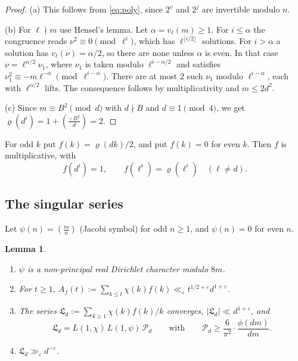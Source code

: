 \documentclass[11pt]{amsart}
\newtheorem{lemma}[theorem]{Lemma}
\theoremstyle{remark}
\theoremstyle{definition}
\numberwithin{equation}{section}
\newcommand{\eps}{\varepsilon}
\newcommand{\Lf}{\mathfrak{L}}
\newcommand{\leg}[2]{\left(\frac{#1}{#2}\right)}
\begin{document}
\begin{proof}
(a) This follows from \eqref{eq:poly}, since $2^v$ and $2^j$ are invertible modulo $n$.

(b) For $\ell\nmid m$ use Hensel's lemma. Let $\alpha=v_\ell(m)\ge1$. For $i\le\alpha$ the congruence reads $\nu^2\equiv0\pmod{\ell^i}$, which has $\ell^{\lfloor i/2\rfloor}$ solutions. For $i>\alpha$ a solution has $v_\ell(\nu)=\alpha/2$, so there are none unless $\alpha$ is even. In that case $\nu=\ell^{\alpha/2}\nu_1$, where $\nu_1$ is taken modulo $\ell^{i-\alpha/2}$ and satisfies $\nu_1^2\equiv-m\ell^{-\alpha}\pmod{\ell^{i-\alpha}}$. There are at most $2$ such $\nu_1$ modulo $\ell^{i-\alpha}$, each with $\ell^{\alpha/2}$ lifts. The consequence follows by multiplicativity and $m\le2d^2$.

(c) Since $m\equiv B^2\pmod d$ with $d\nmid B$ and $d\equiv1\pmod 4$, we get $\varrho(d^i)=1+\leg{-B^2}{d}=2$.
\end{proof}

For odd $k$ put $f(k)=\varrho(dk)/2$, and put $f(k)=0$ for even $k$. Then $f$ is multiplicative, with
\begin{equation}\label{eq:f}
f(d^i)=1,\qquad f(\ell^i)=\varrho(\ell^i)\quad(\ell\ne d).
\end{equation}

\subsection{The singular series}
Let $\psi(n)=\leg mn$ (Jacobi symbol) for odd $n\ge1$, and $\psi(n)=0$ for even $n$.

\begin{lemma}\label{lem:L}
\begin{enumerate}
\item[(a)] $\psi$ is a non-principal real Dirichlet character modulo $8m$.
\item[(b)] For $t\ge1$, $A_f(t):=\sum_{k\le t}\chi(k)f(k)\ll_\eps t^{1/2+\eps}d^{1+\eps}$.
\item[(c)] The series $\Lf_d:=\sum_{k\ge1}\chi(k)f(k)/k$ converges, $|\Lf_d|\ll d^{1+\eps}$, and
\[
\Lf_d=L(1,\chi)\,L(1,\psi)\,\mathcal P_d\qquad\text{with}\qquad \mathcal P_d\ge\frac{6}{\pi^2}\cdot\frac{\phi(dm)}{dm}.
\]
\item[(d)] $\Lf_d\gg_\eps d^{-\eps}$.
\end{enumerate}
\end{lemma}
\end{document}
